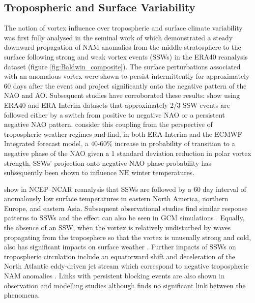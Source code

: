 \subsection{Tropospheric and Surface Variability}
The notion of vortex influence over tropospheric and surface climate variability was first fully analysed in the seminal work of \cite{baldwinStratospheric2001a} which demonstrated a steady downward propagation of NAM anomalies from the middle stratosphere to the surface following strong and weak vortex events (SSWs) in the ERA40 reanalysis dataset (figure \ref{fig:Baldwin_composite}). The surface perturbations associated with an anomalous vortex were shown to persist intermittently for approximately 60 days after the event and project significantly onto the negative pattern of the NAO and AO. Subsequent studies have corroborated these results: \cite{domeisenEstimating2019d} show using ERA40 and ERA-Interim datasets that approximately 2/3 SSW events are followed either by a switch from positive to negative NAO or a persistent negative NAO pattern. \cite{charlton-perezInfluence2018e} consider this coupling from the perspective of tropospheric weather regimes and find, in both ERA-Interim and the ECMWF Integrated forecast model, a 40-60\% increase in probability of transition to a negative phase of the NAO given a 1 standard deviation reduction in polar vortex strength. SSWs' projection onto negative NAO phase probability has subsequently been shown to influence NH winter temperatures.

\cite{thompsonStratospheric2002b} show in NCEP–NCAR reanalysis that SSWs are followed by a 60 day interval of anomalously low surface temperatures in eastern North America, northern Europe, and eastern Asia. Subsequent observational studies find similar response patterns to SSWs \citep{kolstadAssociation2010b, kingObserved2019b, lehtonenObserved2016b} and the effect can also be seen in GCM simulations \citep{tomassiniRole2012b, lehtonenObserved2016b}. Equally, the absence of an SSW, when the vortex is relatively undisturbed by waves propagating from the troposphere so that the vortex is unusually strong and cold, also has significant impacts on surface weather \citep{shawLife2013b, lawrenceRemarkably2020b}. Further impacts of SSWs on tropospheric circulation include an equatorward shift and deceleration of the North Atlantic eddy-driven jet stream which correspond to negative tropospheric NAM anomalies \citep{hitchcockDownward2014b,maycockRegime2020b}. Links with persistent blocking events are also shown in observation and modelling studies \citep{daviniBlocking2014b, vialSudden2013b} although \cite{taguchiThere2008b} finds no significant link between the phenomena.

